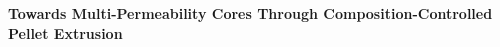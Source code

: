 \documentclass[a4paper,11pt,english]{article}
\begin{document}
\begin{center}
    \textbf{\LARGE Towards Multi-Permeability Cores Through Composition-Controlled Pellet Extrusion}\\[1em]
\end{center}




\newpage
\end{document}
